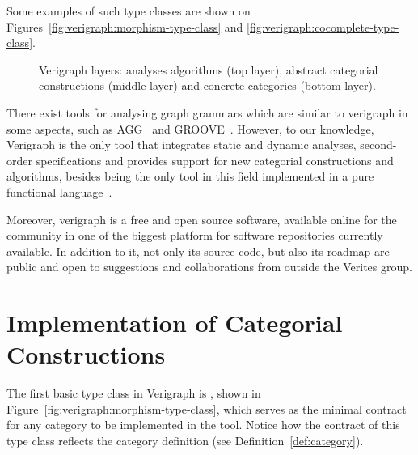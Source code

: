 Some examples of such type classes are shown on
Figures~\ref{fig:verigraph:morphism-type-class} and \ref{fig:verigraph:cocomplete-type-class}.

\begin{figure}[!ht]
  \centering
  \caption{Verigraph layers: analyses algorithms (top layer), abstract categorial constructions (middle layer) and concrete categories (bottom layer).}\label{fig:verigraph:layers}
\end{figure}

There exist tools for analysing graph grammars which are similar to verigraph in some aspects, such as AGG~\cite{Taentzer2000} and GROOVE~\cite{Rensink2004}. However, to our knowledge, Verigraph is the only tool that integrates static and dynamic analyses, second-order specifications and provides support for new categorial constructions and algorithms, besides being the only tool in this field implemented in a pure functional language~\cite{Costa2016}.

Moreover, verigraph is a free and open source software, available online for the community in one of the biggest platform for software repositories currently available. In addition to it, not only its source code, but also its roadmap are public and open to suggestions and collaborations from outside the Verites group.

\section{Implementation of Categorial Constructions}

The first basic type class in Verigraph is , shown in Figure~\ref{fig:verigraph:morphism-type-class}, which serves as the minimal contract for any category to be implemented in the tool. Notice how the contract of this type class reflects the category definition (see Definition~\ref{def:category}).

